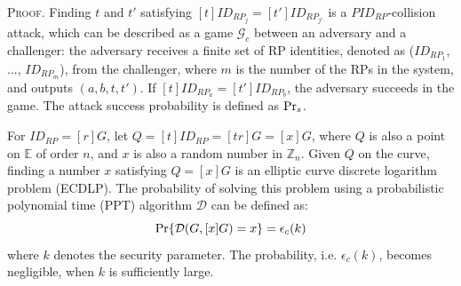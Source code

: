 
\oldc
\vspace{0.75mm}
\noindent\textsc{Proof.} Finding $t$ and $t'$ satisfying $[t]ID_{RP_j} = [t']ID_{RP_{j'}}$ is a $PID_{RP}$-collision attack, which can be described as a game $\mathcal{G}_c$ between an adversary and a challenger: the adversary receives a finite set of RP identities, denoted as ($ID_{RP_1}$, ..., $ID_{RP_m}$), from the challenger, where $m$ is the number of the RPs in the system, and outputs $(a, b, t, t')$.
If $[t]ID_{RP_a}=[t']ID_{RP_b}$, the adversary succeeds in the game.
The attack success probability is defined as ${\rm Pr}_s$.

For $ID_{RP}=[r]G$, let $Q=[t]ID_{RP}=[tr]G=[x]G$, where $Q$ is also a point on $\mathbb{E}$ of order $n$, and $x$ is also a random number in $\mathbb{Z}_n$. Given $Q$ on the curve, finding a number $x$ satisfying $Q = [x]G$ is an elliptic curve discrete logarithm problem (ECDLP). The probability of solving this problem using a probabilistic polynomial time (PPT) algorithm $\mathcal{D}$ can be defined as:
\begin{equation*}
{\rm Pr}\{\mathcal{D}(G, [x]G)=x\} = \epsilon_{c}(k)
\end{equation*}
where $k$ denotes the security parameter. The probability, i.e. $\epsilon_{c}(k)$, becomes negligible, when $k$ is sufficiently large.

